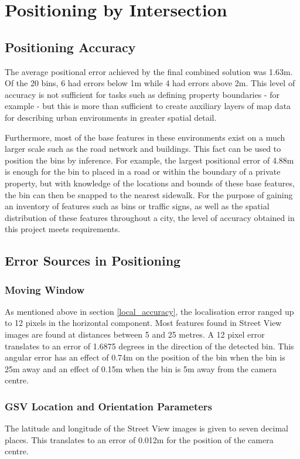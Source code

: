 \section{Positioning by Intersection}

\subsection{Positioning Accuracy}
The average positional error achieved by the final combined solution was 1.63m. Of the 20 bins, 6 had errors below 1m while 4 had errors above 2m. This level of accuracy is not sufficient for tasks such as defining property boundaries - for example - but this is more than sufficient to create auxiliary layers of map data for describing urban environments in greater spatial detail.

Furthermore, most of the base features in these environments exist on a much larger scale such as the road network and buildings. This fact can be used to position the bins by inference. For example, the largest positional error of 4.88m is enough for the bin to placed in a road or within the boundary of a private property, but with knowledge of the locations and bounds of these base features, the bin can then be snapped to the nearest sidewalk. For the purpose of gaining an inventory of features such as bins or traffic signs, as well as the spatial distribution of these features throughout a city, the level of accuracy obtained in this project meets requirements.

\subsection{Error Sources in Positioning}

\subsubsection*{Moving Window}
As mentioned above in section \ref{local_accuracy}, the localisation error ranged up to 12 pixels in the horizontal component. Most features found in Street View images are found at distances between 5 and 25 metres. A 12 pixel error translates to an error of 1.6875 degrees in the direction of the detected bin. This angular error has an effect of 0.74m on the position of the bin when the bin is 25m away and an effect of 0.15m when the bin is 5m away from the camera centre.

\subsubsection*{GSV Location and Orientation Parameters}
The latitude and longitude of the Street View images is given to seven decimal places. This translates to an error of 0.012m for the position of the camera centre.


